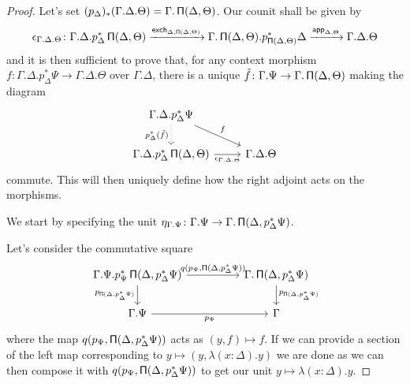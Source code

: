 \begin{proof}
  Let's set $(p_\Delta)_*(\Gamma.\Delta.\Theta)=\Gamma.\operatorname{\mathsf{\Pi}}(\Delta,\Theta)$. Our
  counit shall be given by
  \[\epsilon_{\Gamma.\Delta.\Theta}\colon\Gamma.\Delta.p^*_\Delta\operatorname{\mathsf{\Pi}}(\Delta,\Theta)
  \xrightarrow{\operatorname{\mathsf{exch}}_{\Delta,\operatorname{\mathsf{\Pi}}(\Delta,\Theta)}}\Gamma.\operatorname{\mathsf{\Pi}}(\Delta,\Theta).p^*_{\operatorname{\mathsf{\Pi}}(\Delta,\Theta)}\Delta
  \xrightarrow{\operatorname{\mathsf{app}}_{\Delta,\Theta}}\Gamma.\Delta.\Theta\]
  and it is then sufficient to prove that, for any context morphism
  $f\colon\Gamma.\Delta.p^*_\Delta\Psi\rightarrow\Gamma.\Delta.\Theta$ over
  $\Gamma.\Delta$, there is
  a unique $\tilde{f}\colon\Gamma.\Psi\rightarrow\Gamma.\operatorname{\mathsf{\Pi}}(\Delta,\Theta)$
  making the diagram
  \[\begin{tikzcd}
    {\Gamma.\Delta.p^*_\Delta\Psi} \\
    {\Gamma.\Delta.p^*_\Delta\Pis(\Delta,\Theta)} & {\Gamma.\Delta.\Theta}
    \arrow["f", from=1-1, to=2-2]
    \arrow["{\epsilon_{\Gamma.\Delta.\Theta}}"', from=2-1, to=2-2]
    \arrow["{p^*_\Delta(\tilde{f})}"', dotted, from=1-1, to=2-1]
  \end{tikzcd}\]
  commute. This will then uniquely define how the right adjoint acts on the
  morphisms.

  We start by specifying the unit
  $\eta_{\Gamma.\Psi}\colon\Gamma.\Psi\rightarrow\Gamma.\operatorname{\mathsf{\Pi}}(\Delta,p^*_{\Delta}\Psi)$.

  Let's consider the commutative square
  \[\begin{tikzcd}[column sep=huge]
    {\Gamma.\Psi.p^*_\Psi\Pis(\Delta,p^*_\Delta\Psi)} & {\Gamma.\Pis(\Delta,p^*_\Delta\Psi)} \\
    {\Gamma.\Psi} & \Gamma
    \arrow["{p_{\Pis(\Delta,p^*_\Delta\Psi)}}"', from=1-1, to=2-1]
    \arrow["{p_{\Psi}}"', from=2-1, to=2-2]
    \arrow["{p_{\Pis(\Delta,p^*_\Delta\Psi)}}", from=1-2, to=2-2]
    \arrow["{q(p_\Psi,\Pis(\Delta,p^*_\Delta\Psi))}", from=1-1, to=1-2]
  \end{tikzcd}\]
  where the map $q(p_\Psi,\operatorname{\mathsf{\Pi}}(\Delta,p^*_\Delta\Psi))$ acts as $(y,f)\mapsto
  f$. If we can provide a section of the left map
  corresponding to $y\mapsto(y,\lambda(x:\Delta).y)$ we are
  done as we can then compose
  it with $q(p_\Psi,\operatorname{\mathsf{\Pi}}(\Delta,p^*_\Delta\Psi))$ to get our unit
  $y\mapsto\lambda(x:\Delta).y$.
  

\end{proof}
